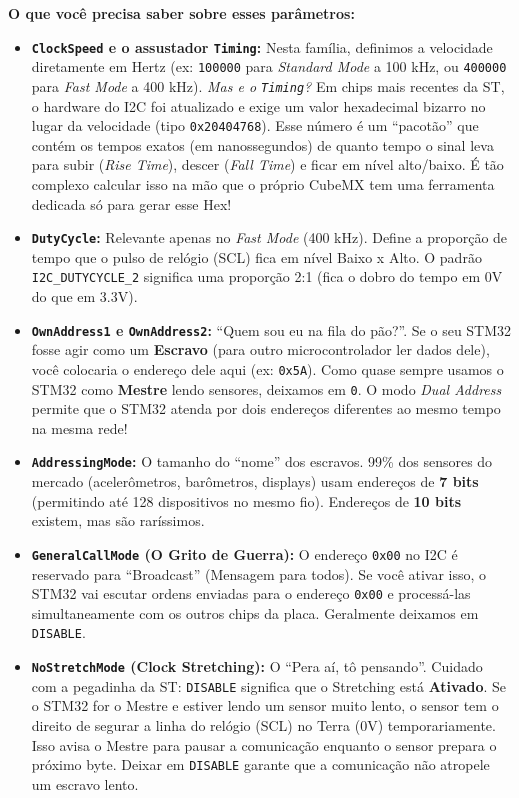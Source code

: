 \documentclass[12pt,a4paper]{article}
\begin{document}
\textbf{O que você precisa saber sobre esses parâmetros:}
\begin{itemize}
    \item \textbf{\texttt{ClockSpeed} e o assustador \texttt{Timing}:} 
    Nesta família, definimos a velocidade diretamente em Hertz (ex: \texttt{100000} para \textit{Standard Mode} a 100 kHz, ou \texttt{400000} para \textit{Fast Mode} a 400 kHz). 
    \textit{Mas e o \texttt{Timing}?} Em chips mais recentes da ST, o hardware do I2C foi atualizado e exige um valor hexadecimal bizarro no lugar da velocidade (tipo \texttt{0x20404768}). Esse número é um ``pacotão'' que contém os tempos exatos (em nanossegundos) de quanto tempo o sinal leva para subir (\textit{Rise Time}), descer (\textit{Fall Time}) e ficar em nível alto/baixo. É tão complexo calcular isso na mão que o próprio CubeMX tem uma ferramenta dedicada só para gerar esse Hex!
    
    \item \textbf{\texttt{DutyCycle}:} Relevante apenas no \textit{Fast Mode} (400 kHz). Define a proporção de tempo que o pulso de relógio (SCL) fica em nível Baixo x Alto. O padrão \texttt{I2C\_DUTYCYCLE\_2} significa uma proporção 2:1 (fica o dobro do tempo em 0V do que em 3.3V).
    
    \item \textbf{\texttt{OwnAddress1} e \texttt{OwnAddress2}:} 
    ``Quem sou eu na fila do pão?''. Se o seu STM32 fosse agir como um \textbf{Escravo} (para outro microcontrolador ler dados dele), você colocaria o endereço dele aqui (ex: \texttt{0x5A}). Como quase sempre usamos o STM32 como \textbf{Mestre} lendo sensores, deixamos em \texttt{0}. O modo \textit{Dual Address} permite que o STM32 atenda por dois endereços diferentes ao mesmo tempo na mesma rede!
    
    \item \textbf{\texttt{AddressingMode}:} O tamanho do ``nome'' dos escravos. 99\% dos sensores do mercado (acelerômetros, barômetros, displays) usam endereços de \textbf{7 bits} (permitindo até 128 dispositivos no mesmo fio). Endereços de \textbf{10 bits} existem, mas são raríssimos.
    
    
    \item \textbf{\texttt{GeneralCallMode} (O Grito de Guerra):} 
    O endereço \texttt{0x00} no I2C é reservado para ``Broadcast'' (Mensagem para todos). Se você ativar isso, o STM32 vai escutar ordens enviadas para o endereço \texttt{0x00} e processá-las simultaneamente com os outros chips da placa. Geralmente deixamos em \texttt{DISABLE}.
    
    \item \textbf{\texttt{NoStretchMode} (Clock Stretching):} 
    O ``Pera aí, tô pensando''. Cuidado com a pegadinha da ST: \texttt{DISABLE} significa que o Stretching está \textbf{Ativado}. Se o STM32 for o Mestre e estiver lendo um sensor muito lento, o sensor tem o direito de segurar a linha do relógio (SCL) no Terra (0V) temporariamente. Isso avisa o Mestre para pausar a comunicação enquanto o sensor prepara o próximo byte. Deixar em \texttt{DISABLE} garante que a comunicação não atropele um escravo lento.
    
    
\end{itemize}
\end{document}
